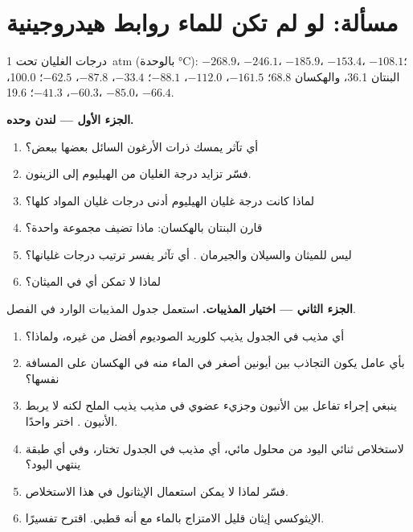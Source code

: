 \section{مسألة: لو لم تكن للماء روابط هيدروجينية}

\begin{problem}
\label{pb:b1:intermolecular-forces-solvents:1}
درجات الغليان تحت \qty{1}{atm} (بالوحدة \unit{\celsius}):  $-268.9$،
 $-246.1$،  $-185.9$،  $-153.4$،  $-108.1$؛
البنتان 36.1، والهكسان 68.8؛  $-161.5$،  $-112.0$،
 $-88.1$؛  $-33.4$،  $-87.8$،  $-62.5$؛
 100.0،  $-60.3$،  $-41.3$؛  19.6،
 $-85.0$،  $-66.4$.

\medskip
\noindent\textbf{الجزء الأول --- لندن وحده.}
\begin{enumerate}
  \item أي تآثر يمسك ذرات الأرغون السائل بعضها ببعض؟
  \item فسّر تزايد درجة الغليان من الهيليوم إلى الزينون.
  \item لماذا كانت درجة غليان الهيليوم أدنى درجات غليان المواد كلها؟
  \item قارن البنتان بالهكسان: ماذا تضيف مجموعة  واحدة؟
  \item ليس للميثان والسيلان والجيرمان . أي
        تآثر يفسر ترتيب درجات غليانها؟
  \item لماذا لا تمكن أي  في الميثان؟
\end{enumerate}

\medskip
\noindent\textbf{الجزء الثاني --- اختيار المذيبات.}
استعمل جدول المذيبات الوارد في الفصل.
\begin{enumerate}[resume]
  \item أي مذيب في الجدول يذيب كلوريد الصوديوم أفضل من غيره،
        ولماذا؟
  \item بأي عامل يكون التجاذب بين أيونين أصغر في
        الماء منه في الهكسان على المسافة نفسها؟
  \item ينبغي إجراء تفاعل بين الأنيون  وجزيء عضوي
        في مذيب يذيب الملح لكنه لا
        يربط الأنيون . اختر واحدًا.
  \item لاستخلاص ثنائي اليود من محلول مائي، أي مذيب في
        الجدول تختار، وفي أي طبقة ينتهي اليود؟
  \item فسّر لماذا لا يمكن استعمال الإيثانول في هذا الاستخلاص.
  \item الإيثوكسي إيثان قليل الامتزاج بالماء مع أنه قطبي.
        اقترح تفسيرًا.
\end{enumerate}


\end{problem}
